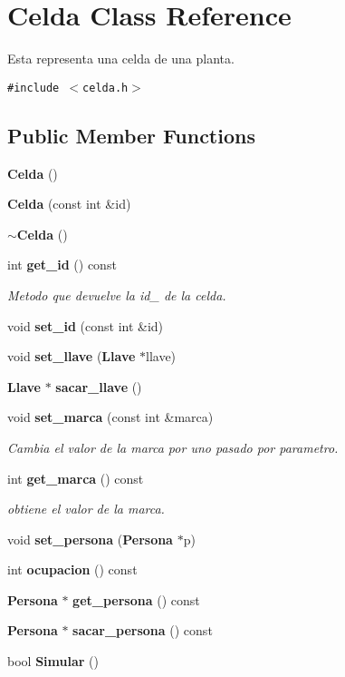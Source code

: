 \section{Celda Class Reference}
\label{classCelda}
Esta representa una celda de una planta.  


{\tt \#include $<$celda.h$>$}

\subsection*{Public Member Functions}
\begin{CompactItemize}
\item 
{\bf Celda} ()
\item 
{\bf Celda} (const int \&id)
\item 
{\bf $\sim$Celda} ()
\item 
int {\bf get\_\-id} () const
\begin{CompactList}\small\item\em Metodo que devuelve la id\_\- de la celda. \item\end{CompactList}\item 
void {\bf set\_\-id} (const int \&id)
\item 
void {\bf set\_\-llave} ({\bf Llave} $\ast$llave)
\item 
{\bf Llave} $\ast$ {\bf sacar\_\-llave} ()
\item 
void {\bf set\_\-marca} (const int \&marca)
\begin{CompactList}\small\item\em Cambia el valor de la marca por uno pasado por parametro. \item\end{CompactList}\item 
int {\bf get\_\-marca} () const
\begin{CompactList}\small\item\em obtiene el valor de la marca. \item\end{CompactList}\item 
void {\bf set\_\-persona} ({\bf Persona} $\ast$p)
\item 
int {\bf ocupacion} () const
\item 
{\bf Persona} $\ast$ {\bf get\_\-persona} () const
\item 
{\bf Persona} $\ast$ {\bf sacar\_\-persona} () const
\item 
bool {\bf Simular} ()
\end{CompactItemize}
